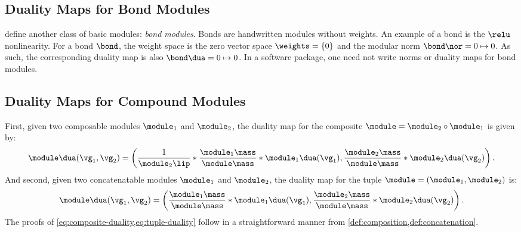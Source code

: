

\subsection{Duality Maps for Bond Modules}

\citet{modula} define another class of basic modules: \textit{bond modules}. Bonds are handwritten modules without weights. An example of a bond is the $\relu$ nonlinearity. For a bond $\bond$, the weight space is the zero vector space $\weights =\{0\}$ and the modular norm $\bond\nor = 0\mapsto 0$. As such, the corresponding duality map is also $\bond\dua = 0\mapsto 0$. In a software package, one need not write norms or duality maps for bond modules.

\subsection{Duality Maps for Compound Modules}
\label{sec:compound-duality}

First, given two composable modules $\module_1$ and $\module_2$, the duality map for the composite $\module= \module_2\circ\module_1$ is given by:
\begin{equation}\label{eq:composite-duality}
    \module\dua(\vg_1, \vg_2) = \left(\frac{1}{\module_2\lip} * \frac{\module_1\mass}{\module\mass} * \module_1\dua(\vg_1), \frac{\module_2\mass}{\module\mass} * \module_2\dua(\vg_2)\right).
\end{equation}
And second, given two concatenatable modules $\module_1$ and $\module_2$, the duality map for the tuple $\module = (\module_1, \module_2)$ is:
\begin{equation}\label{eq:tuple-duality}
    \module\dua(\vg_1, \vg_2) = \left(\frac{\module_1\mass}{\module\mass} * \module_1\dua(\vg_1), \frac{\module_2\mass}{\module\mass} * \module_2\dua(\vg_2)\right).
\end{equation}
The proofs of \cref{eq:composite-duality,eq:tuple-duality} follow in a straightforward manner from
\cref{def:composition,def:concatenation}.


